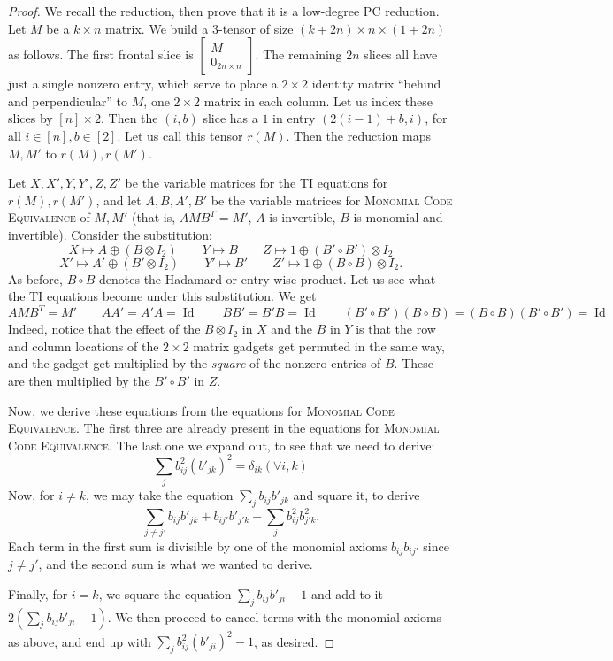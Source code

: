 \documentclass[10pt,a4paper]{article}
\theoremstyle{definition}
\DeclareMathOperator{\Id}{Id}
\begin{document}
\begin{proof}
We recall the reduction, then prove that it is a low-degree PC reduction. Let $M$ be a $k \times n$ matrix. We build a 3-tensor of size $(k+2n) \times n \times (1 + 2n)$ as follows. The first frontal slice is $\begin{bmatrix} M \\ 0_{2n \times n} \end{bmatrix}$. The remaining $2n$ slices all have just a single nonzero entry, which serve to place a $2 \times 2$ identity matrix ``behind and perpendicular'' to $M$, one $2 \times 2$ matrix in each column. Let us index these slices by $[n] \times 2$. Then the $(i,b)$ slice has a $1$ in entry $(2(i-1) + b, i)$, for all $i \in [n], b \in [2]$. Let us call this tensor $r(M)$. Then the reduction maps $M,M'$ to $r(M), r(M')$.

Let $X,X',Y,Y',Z,Z'$ be the variable matrices for the \textsc{TI} equations for $r(M), r(M')$, and let $A,B,A',B'$ be the variable matrices for \textsc{Monomial Code Equivalence} of $M,M'$ (that is, $AMB^T = M'$, $A$ is invertible, $B$ is monomial and invertible). Consider the substitution:
\[
X \mapsto A \oplus (B \otimes I_2) \qquad Y \mapsto B \qquad Z \mapsto 1 \oplus (B' \circ B') \otimes I_2
\]
\[
X' \mapsto A' \oplus (B' \otimes I_2) \qquad Y' \mapsto B' \qquad Z' \mapsto 1 \oplus (B \circ B) \otimes I_2.
\]
As before, $B \circ B$ denotes the Hadamard or entry-wise product. Let us see what the \textsc{TI} equations become under this substitution. We get
\[
AMB^T = M' \qquad AA' = A'A = \Id \qquad BB' = B'B = \Id \qquad (B' \circ B')(B \circ B) = (B \circ B)(B' \circ B') = \Id
\]
Indeed, notice that the effect of the $B \otimes I_2$ in $X$ and the $B$ in $Y$ is that the row and column locations of the $2 \times 2$ matrix gadgets get permuted in the same way, and the gadget get multiplied by the \emph{square} of the nonzero entries of $B$. These are then multiplied by the $B' \circ B'$ in $Z$.

Now, we derive these equations from the equations for \textsc{Monomial Code Equivalence}. The first three are already present in the equations for \textsc{Monomial Code Equivalence}. The last one we expand out, to see that we need to derive:
\[
\sum_{j} b_{ij}^2 (b'_{jk})^2 = \delta_{ik} (\forall i,k)
\]
Now, for $i \neq k$, we may take the equation $\sum_j b_{ij} b'_{jk}$ and square it, to derive
\[
\sum_{j \neq j'} b_{ij} b'_{jk} + b_{ij'} b'_{j'k} + \sum_j b_{ij}^2 b_{j'k}^2.
\]
Each term in the first sum is divisible by one of the monomial axioms $b_{ij} b_{ij'}$ since $j \neq j'$, and the second sum is what we wanted to derive.

Finally, for $i = k$, we square the equation $\sum_j b_{ij} b'_{ji} - 1$ and add to it $2 \left(\sum_j b_{ij} b'_{ji} -1 \right)$. We then proceed to cancel terms with the monomial axioms as above, and end up with $\sum_j b_{ij}^2 (b'_{ji})^2 - 1$, as desired.
\end{proof}
\end{document}
